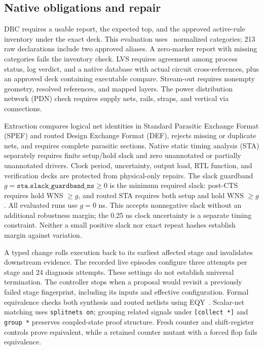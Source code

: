 \documentclass[runningheads]{llncs}
\newcommand{\code}[1]{\texttt{#1}}
\begin{document}
\subsection{Native obligations and repair}
DRC requires a usable report, the expected top, and the approved active-rule
inventory under the exact deck. This evaluation uses \RuleCount\ normalized
categories; 213 raw declarations include two approved aliases. A zero-marker
report with missing categories fails the inventory check. LVS requires
agreement among process status, log verdict, and a native database with actual
circuit cross-references, plus an approved deck containing executable compare.
Stream-out requires nonempty geometry, resolved references, and mapped layers.
The power distribution network (PDN) check requires supply nets, rails,
straps, and vertical via connections.

Extraction compares logical net identities in Standard Parasitic Exchange
Format (SPEF) and routed Design Exchange Format (DEF), rejects missing or
duplicate nets, and requires complete parasitic sections. Native static timing
analysis (STA) separately requires finite setup/hold slack and zero unannotated
or partially unannotated drivers. Clock period, uncertainty, output load, RTL
function, and verification decks are protected from physical-only repairs.
The slack guardband $g=\code{sta.slack\_guardband\_ns}\geq0$ is the
minimum required slack: post-CTS requires hold WNS $\geq g$, and routed STA
requires both setup and hold WNS $\geq g$. All evaluated runs use $g=0$ ns.
This accepts nonnegative slack without an additional robustness margin; the
0.25 ns clock uncertainty is a separate timing constraint. Neither a small
positive slack nor exact repeat hashes establish margin against variation.

A typed change rolls execution back to its earliest affected stage and
invalidates downstream evidence. The recorded live episodes configure three
attempts per stage and 24 diagnosis attempts. These settings do not establish
universal termination. The controller stops when a
proposal would revisit a previously failed stage fingerprint, including its
inputs and effective configuration. Formal equivalence checks both synthesis
and routed netlists using EQY~\cite{eqydocs}. Scalar-net matching uses
\code{splitnets on}; grouping related signals under \code{[collect *]} and
\code{group *} preserves coupled-state proof structure. Fresh counter and
shift-register controls prove equivalent, while a retained counter mutant
with a forced flop fails equivalence.
\end{document}
